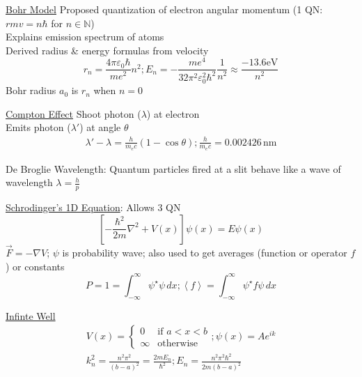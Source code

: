 \documentclass[8pt]{extarticle}
\begin{document}
    \underline{Bohr Model} Proposed quantization of electron angular momentum (1 QN: $rmv = n\hbar$ for $n \in \mathbb{N}$)\\
        Explains emission spectrum of atoms\\
        Derived radius \& energy formulas from velocity
        \begin{equation*}
            r_n = \frac{4\pi\varepsilon_0\hbar}{me^2}n^2;
            E_n = -\frac{me^4}{32\pi^2\varepsilon_0^2\hbar^2}\frac{1}{n^2} \approx \frac{-13.6\unit{\eV}}{n^2}
        \end{equation*}
        Bohr radius $a_0$ is $r_n$ when $n = 0$

    \underline{Compton Effect} Shoot photon ($\lambda$) at electron\\ Emits photon ($\lambda'$) at angle $\theta$
    \begin{gather*}
        \lambda' - \lambda = \frac{h}{m_e c} (1 - \cos\theta);
        \frac{h}{m_e c} = 0.002426\,\unit{\nano\meter}
    \end{gather*}

    De Broglie Wavelength: Quantum particles fired at a slit behave like a wave of wavelength $\lambda = \frac{h}{p}$

    \underline{Schrodinger's 1D Equation}: Allows 3 QN
    \begin{equation*}
        \left[ -\frac{\hbar^2}{2m}\nabla^2 + V(x) \right]\psi(x) = E\psi(x)
    \end{equation*}
    $\vec{F} = -\nabla V$; $\psi$ is probability wave; also used to get averages (function or operator $f$) or constants\\
    \begin{equation*}
        P = 1 = \int_{-\infty}^{\infty} \psi^\star \psi\,dx; \left\langle f \right\rangle = \int_{-\infty}^{\infty} \psi^\star f \psi\,dx
    \end{equation*}

    \underline{Infinte Well}
    \begin{gather*}
        V(x) = \begin{cases}
            0 & \text{if } a < x < b \\
            \infty & \text{otherwise}
        \end{cases}; \psi(x) = Ae^{ik}\\
        k_n^2 = \frac{n^2\pi^2}{(b - a)^2} = \frac{2mE_n}{\hbar^2};
        E_n = \frac{n^2\pi^2\hbar^2}{2m(b - a)^2}
    \end{gather*}
\end{document}

